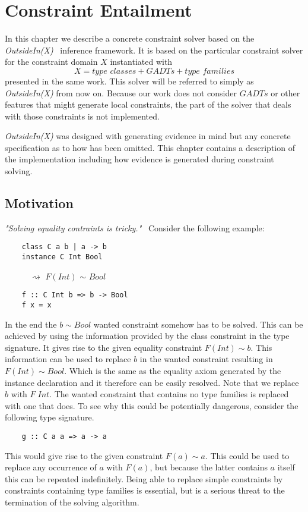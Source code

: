 \chapter{Constraint Entailment}
\label{cha:entailment}
In this chapter we describe a concrete constraint solver based on the
\textit{OutsideIn(X)}~\cite{outsideinx-modular-type-inference-with-local-assumptions}
inference framework. It is based on the particular constraint solver for the
constraint domain $X$ instantiated with
\[
X = \textit{type classes} + \textit{GADTs} + \textit{type families}
\]
presented in the same work. This solver will be referred to simply as
\textit{OutsideIn(X)} from now on. Because our work does not consider $GADTs$ or other
features that might generate local constraints, the part of the solver that
deals with those constraints is not implemented.

\textit{OutsideIn(X)} was designed with generating evidence in mind but any
concrete specification as to how has been omitted. This chapter contains a
description of the implementation including how evidence is generated during
constraint solving.

\section{Motivation}
\label{sec:motivation}
\textit{"Solving equality contraints is
tricky."}~\cite{outsideinx-modular-type-inference-with-local-assumptions}
Consider the following example:
\begin{verbatim}
    class C a b | a -> b
    instance C Int Bool
\end{verbatim}
$\quad\quad\quad\rightsquigarrow$ $F(Int)$ $\sim$ $Bool$
\begin{verbatim}
    f :: C Int b => b -> Bool
    f x = x
\end{verbatim}

In the end the $b \sim Bool$ wanted constraint somehow has to be solved. This
can be achieved by using the information provided by the class constraint in the
type signature. It gives rise to the given equality constraint $F(Int) \sim
b$. This information can be used to replace $b$ in the wanted constraint
resulting in $F(Int) \sim Bool$. Which is the same as the equality axiom
generated by the instance declaration and it therefore can be easily resolved.
Note that we replace $b$ with $F \; Int$. The wanted constraint that contains no
type families is replaced with one that does. To see why this
could be potentially dangerous, consider the following type signature.
\begin{verbatim}
    g :: C a a => a -> a
\end{verbatim}
This would give rise to the given constraint $F(a) \sim a$. This could be used
to replace any occurrence of $a$ with $F(a)$, but because the latter contains
$a$ itself this can be repeated indefinitely. Being able to replace simple
constraints by constraints containing type families is essential, but is a serious threat to the
termination of the solving algorithm.

